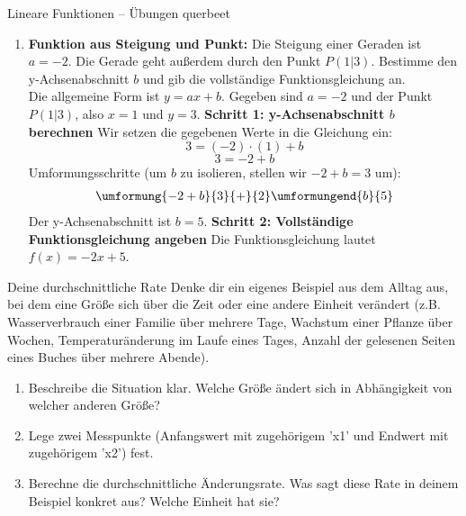 \begin{loesungsumgebung}{Lineare Funktionen – Übungen querbeet}
\begin{enumerate}
    \item \textbf{Funktion aus Steigung und Punkt:} Die Steigung einer Geraden ist $a = -2$. Die Gerade geht außerdem durch den Punkt $P(1|3)$. Bestimme den y-Achsenabschnitt $b$ und gib die vollständige Funktionsgleichung an. \\
    Die allgemeine Form ist $y = ax+b$. Gegeben sind $a=-2$ und der Punkt $P(1|3)$, also $x=1$ und $y=3$.
    \textbf{Schritt 1: y-Achsenabschnitt $b$ berechnen}
    Wir setzen die gegebenen Werte in die Gleichung ein:
    $$ 3 = (-2) \cdot (1) + b $$
    $$ 3 = -2 + b $$
    Umformungsschritte (um $b$ zu isolieren, stellen wir $-2+b=3$ um):
    $$
    \begin{array}{r c l c l}
    \umformung{-2+b}{3}{+}{2}
    \umformungend{b}{5}
    \end{array}
    $$
    Der y-Achsenabschnitt ist $b=5$.
    \textbf{Schritt 2: Vollständige Funktionsgleichung angeben}
    Die Funktionsgleichung lautet $f(x) = -2x + 5$.
\end{enumerate}

\end{loesungsumgebung}

\begin{aufgabenumgebung}{Deine durchschnittliche Rate}
Denke dir ein eigenes Beispiel aus dem Alltag aus, bei dem eine Größe sich über die Zeit oder eine andere Einheit verändert (z.B. Wasserverbrauch einer Familie über mehrere Tage, Wachstum einer Pflanze über Wochen, Temperaturänderung im Laufe eines Tages, Anzahl der gelesenen Seiten eines Buches über mehrere Abende).
\begin{enumerate}
    \item Beschreibe die Situation klar. Welche Größe ändert sich in Abhängigkeit von welcher anderen Größe?
    \item Lege zwei Messpunkte (Anfangswert mit zugehörigem 'x1' und Endwert mit zugehörigem 'x2') fest.
    \item Berechne die durchschnittliche Änderungsrate. Was sagt diese Rate in deinem Beispiel konkret aus? Welche Einheit hat sie?
\end{enumerate}
\end{aufgabenumgebung}

